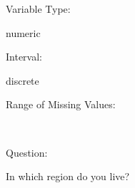\documentclass[
]{article}
\begin{document}
\begin{minipage}[t]{0.3\linewidth}

Variable Type:

\end{minipage}%
\begin{minipage}[t]{0.7\linewidth}

numeric

\end{minipage}

\begin{minipage}[t]{0.3\linewidth}

Interval:

\end{minipage}%
\begin{minipage}[t]{0.7\linewidth}

discrete

\end{minipage}

\begin{minipage}[t]{0.3\linewidth}

Range of Missing Values:

\end{minipage}%
\begin{minipage}[t]{0.7\linewidth}

~

\end{minipage}

\begin{minipage}[t]{0.3\linewidth}

Question:

\end{minipage}%
\begin{minipage}[t]{0.7\linewidth}

In which region do you live?

\end{minipage}
\end{document}
